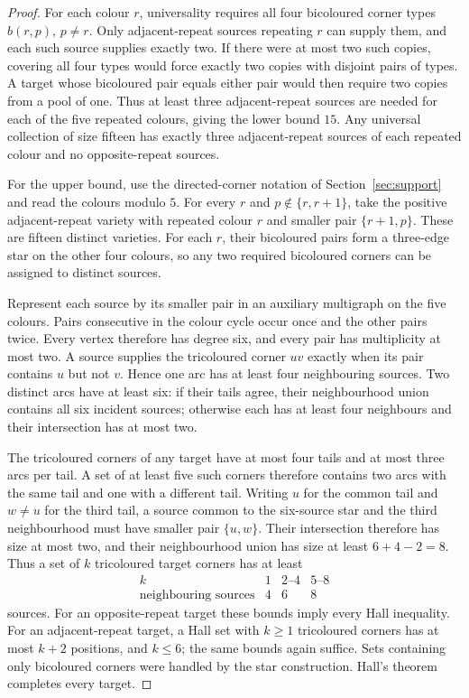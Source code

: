 \begin{proof}
For each colour $r$, universality requires all four bicoloured corner types
$b(r,p)$, $p\ne r$. Only adjacent-repeat sources repeating $r$ can supply
them, and each such source supplies exactly two. If there were at most two
such copies, covering all four types would force exactly two copies with
disjoint pairs of types. A target whose bicoloured pair equals either pair
would then require two copies from a pool of one. Thus at least three
adjacent-repeat sources are needed for each of the five repeated colours,
giving the lower bound $15$. Any universal collection of size fifteen has
exactly three adjacent-repeat sources of each repeated colour and no
opposite-repeat sources.

For the upper bound, use the directed-corner notation of
Section~\ref{sec:support} and read the colours modulo $5$. For every $r$ and
$p\notin\{r,r+1\}$, take the positive adjacent-repeat variety with repeated
colour $r$ and smaller pair $\{r+1,p\}$. These are fifteen distinct varieties.
For each $r$, their bicoloured pairs form a three-edge star on the other
four colours, so any two required bicoloured corners can be assigned to
distinct sources.

Represent each source by its smaller pair in an auxiliary multigraph on the
five colours. Pairs consecutive in the colour cycle occur once and the other
pairs twice. Every vertex therefore has degree six, and every pair has
multiplicity at most two. A source supplies the tricoloured corner $uv$
exactly when its pair contains $u$ but not $v$. Hence one arc has at least
four neighbouring sources. Two distinct arcs have at least six: if their
tails agree, their neighbourhood union contains all six incident sources;
otherwise each has at least four neighbours and their intersection has at
most two.

The tricoloured corners of any target have at most four tails and at most
three arcs per tail. A set of at least five such corners therefore contains
two arcs with the same tail and one with a different tail. Writing $u$ for
the common tail and $w\ne u$ for the third tail, a source common to the
six-source star and the third neighbourhood must have smaller pair $\{u,w\}$.
Their intersection therefore has size at most two, and their neighbourhood
union has size at least $6+4-2=8$. Thus a set of $k$ tricoloured target corners
has at least
\[
\begin{array}{c|ccc}
 k&1&2\text{--}4&5\text{--}8\\\hline
 \text{neighbouring sources}&4&6&8
\end{array}
\]
sources. For an opposite-repeat target these bounds imply every Hall
inequality. For an adjacent-repeat target, a Hall set with $k\ge1$
tricoloured corners has at most $k+2$ positions, and $k\le6$; the same bounds
again suffice. Sets containing only bicoloured corners were handled by the
star construction. Hall's theorem completes every target.
\end{proof}

